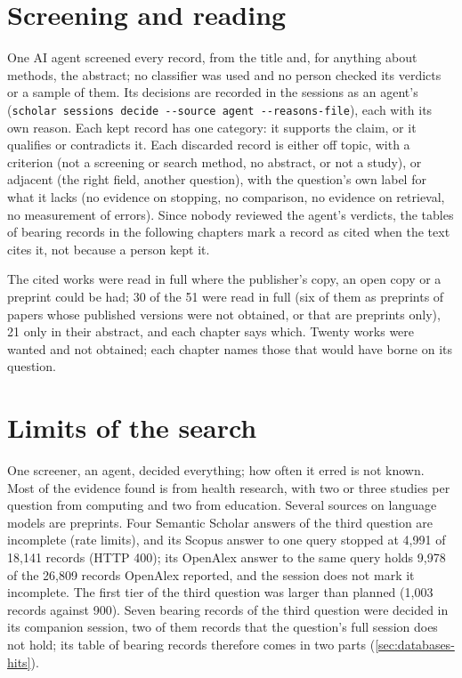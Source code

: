 \section{Screening and reading}
\label{sec:search-screening}

One AI agent screened every record, from the title and, for anything
about methods, the abstract; no classifier was used and no person checked
its verdicts or a sample of them.
Its decisions are recorded in the sessions as an agent's
(\texttt{scholar sessions decide -{}-source agent -{}-reasons-file}), each
with its own reason.
Each kept record has one category: it supports the claim, or it
qualifies or contradicts it.
Each discarded record is either off topic, with a criterion (not a
screening or search method, no abstract, or not a study), or adjacent (the
right field, another question), with the question's own label for what it
lacks (no evidence on stopping, no comparison, no evidence on retrieval,
no measurement of errors).
Since nobody reviewed the agent's verdicts, the tables of bearing records
in the following chapters mark a record as cited when the text cites it,
not because a person kept it.

The cited works were read in full where the publisher's copy, an open
copy or a preprint could be had; 30 of the 51 were read in full (six of
them as preprints of papers whose published versions were not obtained,
or that are preprints only), 21 only in their abstract, and each chapter
says which.
Twenty works were wanted and not obtained; each chapter names those that
would have borne on its question.

\section{Limits of the search}
\label{sec:search-limits}

One screener, an agent, decided everything; how often it erred is not
known.
Most of the evidence found is from health research, with two or three
studies per question from computing and two from education.
Several sources on language models are preprints.
Four Semantic Scholar answers of the third question are incomplete
(rate limits), and its Scopus answer to one query stopped at 4,991 of
18,141 records (HTTP 400); its OpenAlex answer to the same query holds
9,978 of the 26,809 records OpenAlex reported, and the session does not
mark it incomplete.
The first tier of the third question was larger than planned (1,003
records against 900).
Seven bearing records of the third question were decided in its companion
session, two of them records that the question's full session does not
hold; its table of bearing records therefore comes in two parts
(\cref{sec:databases-hits}).
